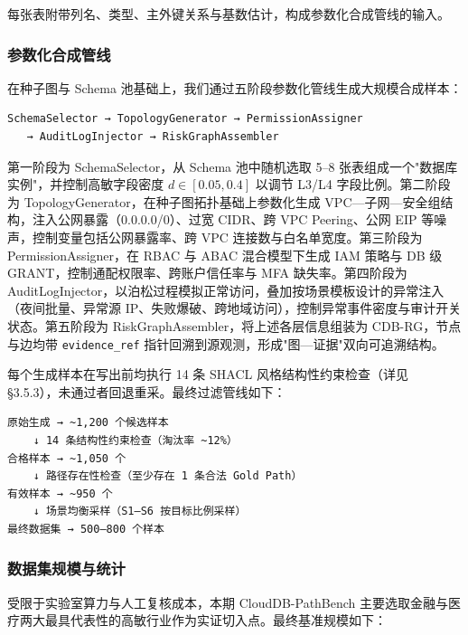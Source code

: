 \documentclass[a4paper,12pt]{ctexart}
\begin{document}
每张表附带列名、类型、主外键关系与基数估计，构成参数化合成管线的输入。

\subsubsection{参数化合成管线}

在种子图与 Schema 池基础上，我们通过五阶段参数化管线生成大规模合成样本：

\begin{verbatim}
SchemaSelector → TopologyGenerator → PermissionAssigner
   → AuditLogInjector → RiskGraphAssembler
\end{verbatim}

第一阶段为 SchemaSelector，从 Schema 池中随机选取 5–8 张表组成一个"数据库实例"，并控制高敏字段密度 $d \in [0.05, 0.4]$ 以调节 L3/L4 字段比例。第二阶段为 TopologyGenerator，在种子图拓扑基础上参数化生成 VPC—子网—安全组结构，注入公网暴露（0.0.0.0/0）、过宽 CIDR、跨 VPC Peering、公网 EIP 等噪声，控制变量包括公网暴露率、跨 VPC 连接数与白名单宽度。第三阶段为 PermissionAssigner，在 RBAC 与 ABAC 混合模型下生成 IAM 策略与 DB 级 GRANT，控制通配权限率、跨账户信任率与 MFA 缺失率。第四阶段为 AuditLogInjector，以泊松过程模拟正常访问，叠加按场景模板设计的异常注入（夜间批量、异常源 IP、失败爆破、跨地域访问），控制异常事件密度与审计开关状态。第五阶段为 RiskGraphAssembler，将上述各层信息组装为 CDB-RG，节点与边均带 \texttt{evidence\_ref} 指针回溯到源观测，形成"图—证据"双向可追溯结构。

每个生成样本在写出前均执行 14 条 SHACL 风格结构性约束检查（详见 §3.5.3），未通过者回退重采。最终过滤管线如下：

\begin{verbatim}
原始生成 → ~1,200 个候选样本
    ↓ 14 条结构性约束检查（淘汰率 ~12%）
合格样本 → ~1,050 个
    ↓ 路径存在性检查（至少存在 1 条合法 Gold Path）
有效样本 → ~950 个
    ↓ 场景均衡采样（S1–S6 按目标比例采样）
最终数据集 → 500–800 个样本
\end{verbatim}

\subsubsection{数据集规模与统计}

受限于实验室算力与人工复核成本，本期 CloudDB-PathBench 主要选取金融与医疗两大最具代表性的高敏行业作为实证切入点。最终基准规模如下：
\end{document}
